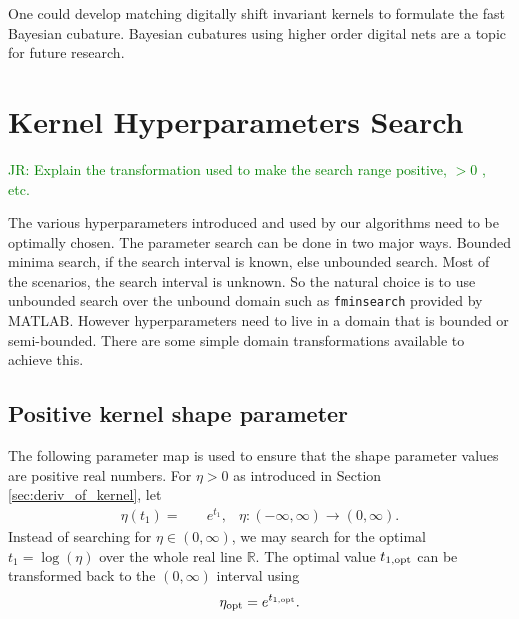 \documentclass{svjour3}                     %
\newcommand{\reals}{\mathbb{R}}
\newcommand{\code}[1]{\texttt{#1}}
\newcommand{\JRNote}[1]{{\textcolor{green}{JR: #1}}}
\begin{document}
One could develop matching digitally shift invariant kernels to formulate the fast Bayesian cubature. Bayesian cubatures using higher order digital nets are a topic for future research.











\section{Kernel Hyperparameters Search}
\label{sec:kernel_param_search}

\JRNote{Explain the transformation used to make the search range positive, $> 0$ , etc.}

The various hyperparameters introduced and used by our algorithms need to be optimally chosen. %
The parameter search can be done in two major ways. 
Bounded minima search, if the search interval is known, else unbounded search.  Most of the scenarios, the search interval is unknown. So the natural choice is to use unbounded search over the unbound domain such as \code{fminsearch} provided by MATLAB.
However hyperparameters need to live in a domain that is bounded or semi-bounded. 
There are some simple domain transformations available to achieve this.

\subsection{Positive kernel shape parameter}
The following parameter map is used to ensure that the shape parameter values are positive real numbers. For $\eta > 0$ as introduced in Section \ref{sec:deriv_of_kernel}, let
\begin{align*}
\eta{(t_1)} = & \quad e^{t_1}, & \eta : (-\infty, \infty) \to (0, \infty).
\end{align*}
Instead of searching for $\eta \in (0, \infty)$, we may search for the optimal $t_1 = \log(\eta)$ over the whole real line $\reals$. 
The optimal value $t_{1, \textup{opt}}$ can be transformed back to the $(0, \infty)$ interval using 
\begin{align*}
\eta_{\textup{opt}} = e^{t_{1,\textup{opt}}}.
\end{align*}
\end{document}
